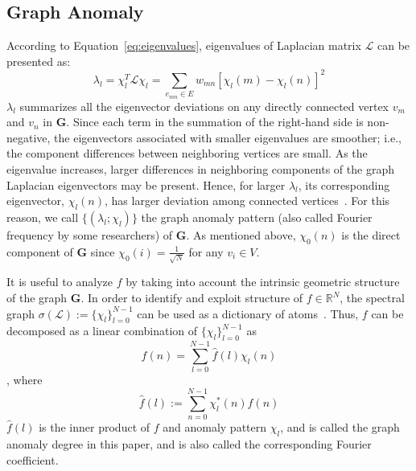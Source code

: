 \subsection{Graph Anomaly}
\label{sec:Graph_Anomaly}
According to Equation~\ref{eq:eigenvalues}, eigenvalues of Laplacian matrix $\mathcal{L}$ can be presented as:
\begin{equation}
\label{eq:lambda}
\lambda_{l}=\chi_{l}^T\mathcal{L}\chi_{l}= \sum_{e_{mn}\in E} w_
{mn}[\chi_{l}(m)-\chi_{l}(n)]^2
\end{equation}
$\lambda_l$ summarizes all the eigenvector deviations on any directly connected vertex $v_m$ and $v_n$ in $\mathbf{G}$. Since each term in the summation of the right-hand side is non-negative, the eigenvectors associated with smaller eigenvalues are smoother; i.e., the component differences between neighboring vertices are
small. As the eigenvalue increases, larger differences in neighboring
components of the graph Laplacian eigenvectors may be present.
Hence, for larger $\lambda_l$, its corresponding eigenvector, $\chi_l(n)$, has larger deviation among connected vertices~\cite{shuman2015vertex}. For this reason, we call $\{(\lambda_l;\chi_l)\}$ the graph anomaly pattern (also called Fourier frequency by some researchers) of $\mathbf{G}$. As mentioned above, $\chi_0(n)$ is the direct component of $\mathbf{G}$ since $\chi_0(i)=\frac{1}{\sqrt{N}}$ for any $v_i\in V$.


It is useful to analyze $f$ by taking into account the intrinsic geometric structure of the graph $\mathbf{G}$. In order to identify and exploit structure of $f\in \mathbb{R}^N$, the spectral graph $\sigma({\mathcal{L}}):=\{\chi_l\}_{l=0}^{N-1}$ can be used as a dictionary of atoms~\cite{shuman_ACHA_2013}. Thus, $f$ can be decomposed as a linear combination of $\{\chi_l\}_{l=0}^{N-1}$ as
\begin{equation}
\label{eq:graphFourier}
f(n)= \sum\limits_{l=0}^{N-1}\hat{f}(l)\chi_l(n)
\end{equation}
, where
\begin{equation}
\label{eq:graphFourier1}
\hat{f}(l):= \sum\limits_{n=0}^{N-1}\chi^*_l(n)f(n)
\end{equation}
$\hat{f}(l)$ is the inner product of $f$ and anomaly pattern $\chi_l$, and is called the graph anomaly degree in this paper, and is also called the corresponding Fourier coefficient.


